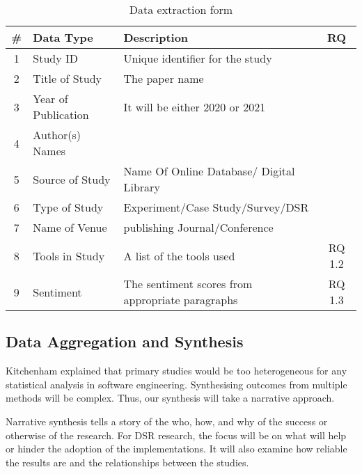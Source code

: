 \begin{table}[h]
	\centering
	\begin{tabular}{|c | l | l | c |} 
		\hline
		\#& Data Type           & Description                                          & RQ     \\ \hline
		\hline
        1 & Study ID            & Unique identifier for the study                      &        \\ \hline
        2 & Title of Study      & The paper name                                       &        \\ \hline
        3 & Year of Publication & It will be either 2020 or 2021                       &        \\ \hline
        4 & Author(s) Names     &                                                      &        \\ \hline
        5 & Source of Study     & Name Of Online Database/ Digital Library             &        \\ \hline
        6 & Type of Study       & Experiment/Case Study/Survey/DSR                     &        \\ \hline
        7 & Name of Venue       & publishing Journal/Conference                        &        \\ \hline
        8 & Tools in Study      & A list of the tools used                             & RQ 1.2 \\ \hline
        9 & Sentiment           & The sentiment scores from appropriate paragraphs     & RQ 1.3 \\ \hline		
	\end{tabular}	
	\caption{Data extraction form}
    \label{table:Data_Extraction_Form}
\end{table}

\subsection{Data Aggregation and Synthesis}
Kitchenham\cite{kitchenham2015evidence} explained that primary studies would be too heterogeneous for any statistical analysis in software engineering. 
Synthesising outcomes from multiple methods will be complex.
Thus, our synthesis will take a narrative approach.

Narrative synthesis tells a story of the who, how, and why of the success or otherwise of the research.
For DSR research, the focus will be on what will help or hinder the adoption of the implementations.
It will also examine how reliable the results are and the relationships between the studies.

